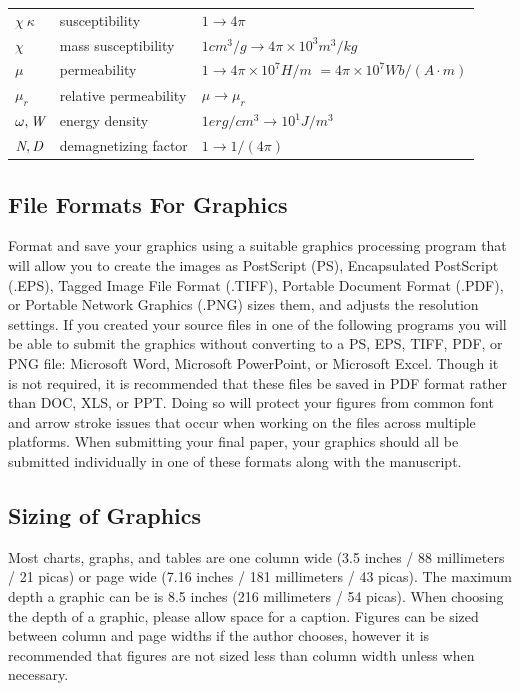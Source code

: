 \documentclass[journal]{IEEEtranTIE}
\begin{document}
\begin{table}[!t]
{\begin{tabular}{l l l}
			$ \chi \ \kappa $ & susceptibility & $ 1 \rightarrow 4\pi $ \\ 
			$ \chi  $ & mass susceptibility & $ 1 cm^3/g \rightarrow 4\pi \times 10^{3} m^3/kg $ \\ 
			\pbox{20cm}{$ \mu $ \\ \hphantom{1}} & \pbox{20cm}{permeability \\ \hphantom{1}} & \pbox{20cm}{$ 1 \rightarrow 4\pi \times 10^{7} H/m $ \\ \hphantom{1} $ =4\pi \times 10^{7} Wb/(A \cdot m) $ } \\ 
			$ \mu_r $ & relative permeability & $ \mu \rightarrow \mu_r $ \\ 
			$ \omega, \emph{W} $ & energy density & $ 1 erg/cm^3 \rightarrow 10^1 J/m^3 $ \\ 
			$ \emph{N}, \emph{D} $ & demagnetizing factor & $ 1 \rightarrow 1/(4\pi) $ \\ [1.4ex]
			\hline\hline
		\end{tabular}
	}
\end{table}

\subsection{File Formats For Graphics}

Format and save your graphics using a suitable graphics processing program that will allow you to create the images as PostScript (PS), Encapsulated PostScript (.EPS), Tagged Image File Format (.TIFF), Portable Document Format (.PDF), or Portable Network Graphics (.PNG) sizes them, and adjusts the resolution settings. If you created your source files in one of the following programs you will be able to submit the graphics without converting to a PS, EPS, TIFF, PDF, or PNG file: Microsoft Word, Microsoft PowerPoint, or Microsoft Excel. Though it is not required, it is recommended that these files be saved in PDF format rather than DOC, XLS, or PPT. Doing so will protect your figures from common font and arrow stroke issues that occur when working on the files across multiple platforms. When submitting your final paper, your graphics should all be submitted individually in one of these formats along with the manuscript.


\subsection{Sizing of Graphics}

Most charts, graphs, and tables are one column wide (3.5 inches / 88 millimeters / 21 picas) or page wide (7.16 inches / 181 millimeters / 43 picas). The maximum depth a graphic can be is 8.5 inches (216 millimeters / 54 picas). When choosing the depth of a graphic, please allow space for a caption. Figures can be sized between column and page widths if the author chooses, however it is recommended that figures are not sized less than column width unless when necessary.
\end{document}
